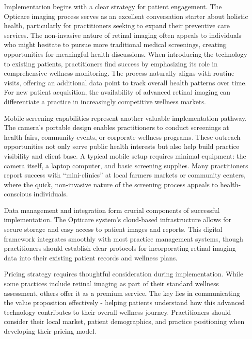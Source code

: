 \documentclass[
  Letterpaper,
]{scrbook}
\begin{document}
Implementation begins with a clear strategy for patient engagement. The
Opticare imaging process serves as an excellent conversation starter
about holistic health, particularly for practitioners seeking to expand
their preventive care services. The non-invasive nature of retinal
imaging often appeals to individuals who might hesitate to pursue more
traditional medical screenings, creating opportunities for meaningful
health discussions. When introducing the technology to existing
patients, practitioners find success by emphasizing its role in
comprehensive wellness monitoring. The process naturally aligns with
routine visits, offering an additional data point to track overall
health patterns over time. For new patient acquisition, the availability
of advanced retinal imaging can differentiate a practice in increasingly
competitive wellness markets.

Mobile screening capabilities represent another valuable implementation
pathway. The camera's portable design enables practitioners to conduct
screenings at health fairs, community events, or corporate wellness
programs. These outreach opportunities not only serve public health
interests but also help build practice visibility and client base. A
typical mobile setup requires minimal equipment: the camera itself, a
laptop computer, and basic screening supplies. Many practitioners report
success with ``mini-clinics'' at local farmers markets or community
centers, where the quick, non-invasive nature of the screening process
appeals to health-conscious individuals.

Data management and integration form crucial components of successful
implementation. The Opticare system's cloud-based infrastructure allows
for secure storage and easy access to patient images and reports. This
digital framework integrates smoothly with most practice management
systems, though practitioners should establish clear protocols for
incorporating retinal imaging data into their existing patient records
and wellness plans.

Pricing strategy requires thoughtful consideration during
implementation. While some practices include retinal imaging as part of
their standard wellness assessment, others offer it as a premium
service. The key lies in communicating the value proposition effectively
- helping patients understand how this advanced technology contributes
to their overall wellness journey. Practitioners should consider their
local market, patient demographics, and practice positioning when
developing their pricing model.
\end{document}
